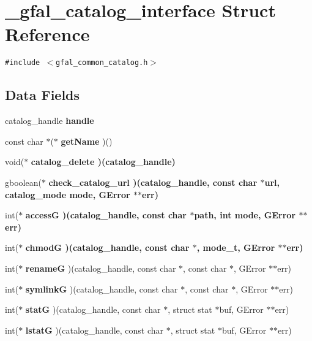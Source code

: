 \section{\_\-gfal\_\-catalog\_\-interface Struct Reference}
\label{struct__gfal__catalog__interface}
{\tt \#include $<$gfal\_\-common\_\-catalog.h$>$}

\subsection*{Data Fields}
\begin{CompactItemize}
\item 
catalog\_\-handle \textbf{handle}\label{struct__gfal__catalog__interface_21ece9deeb92b4182cf5fe09e174d6c5}

\item 
const char $\ast$($\ast$ \textbf{get\-Name} )()\label{struct__gfal__catalog__interface_a76db9e70bcd22d79d2a40a12049cea9}

\item 
void($\ast$ \bf{catalog\_\-delete} )(catalog\_\-handle)
\item 
gboolean($\ast$ \bf{check\_\-catalog\_\-url} )(catalog\_\-handle, const char $\ast$url, catalog\_\-mode mode, GError $\ast$$\ast$err)
\item 
int($\ast$ \bf{access\-G} )(catalog\_\-handle, const char $\ast$path, int mode, GError $\ast$$\ast$err)
\item 
int($\ast$ \bf{chmod\-G} )(catalog\_\-handle, const char $\ast$, mode\_\-t, GError $\ast$$\ast$err)
\item 
int($\ast$ \textbf{rename\-G} )(catalog\_\-handle, const char $\ast$, const char $\ast$, GError $\ast$$\ast$err)\label{struct__gfal__catalog__interface_3ff4627bf8b55f2a650e03e2be21637a}

\item 
int($\ast$ \textbf{symlink\-G} )(catalog\_\-handle, const char $\ast$, const char $\ast$, GError $\ast$$\ast$err)\label{struct__gfal__catalog__interface_1cff8d0398d6f5fbbd74d4bbfb88a84b}

\item 
int($\ast$ \textbf{stat\-G} )(catalog\_\-handle, const char $\ast$, struct stat $\ast$buf, GError $\ast$$\ast$err)\label{struct__gfal__catalog__interface_c93cfe7bbdd166977a30c0821188256d}

\item 
int($\ast$ \textbf{lstat\-G} )(catalog\_\-handle, const char $\ast$, struct stat $\ast$buf, GError $\ast$$\ast$err)\label{struct__gfal__catalog__interface_29c3519fdaa2768abc5b0ca8d5b1b278}


\end{CompactItemize}
